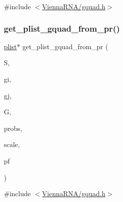 {\ttfamily \#include $<$\mbox{\hyperlink{gquad_8h}{Vienna\+R\+N\+A/gquad.\+h}}$>$}

\mbox{\label{group__gquads_ga098bdc8057dbcef81f9e6390450d4d88}} 
\subsubsection{\texorpdfstring{get\+\_\+plist\+\_\+gquad\+\_\+from\+\_\+pr()}{get\_plist\_gquad\_from\_pr()}}
{\footnotesize\ttfamily \mbox{\hyperlink{group__data__structures_ga9608eed021ebfbdd7a901cfdc446c8e9}{plist}}$\ast$ get\+\_\+plist\+\_\+gquad\+\_\+from\+\_\+pr (\begin{DoxyParamCaption}\item[{short $\ast$}]{S,  }\item[{int}]{gi,  }\item[{int}]{gj,  }\item[{\mbox{\hyperlink{group__data__structures_ga31125aeace516926bf7f251f759b6126}{F\+L\+T\+\_\+\+O\+R\+\_\+\+D\+BL}} $\ast$}]{G,  }\item[{\mbox{\hyperlink{group__data__structures_ga31125aeace516926bf7f251f759b6126}{F\+L\+T\+\_\+\+O\+R\+\_\+\+D\+BL}} $\ast$}]{probs,  }\item[{\mbox{\hyperlink{group__data__structures_ga31125aeace516926bf7f251f759b6126}{F\+L\+T\+\_\+\+O\+R\+\_\+\+D\+BL}} $\ast$}]{scale,  }\item[{\mbox{\hyperlink{group__energy__parameters_ga01d8b92fe734df8d79a6169482c7d8d8}{vrna\+\_\+exp\+\_\+param\+\_\+t}} $\ast$}]{pf }\end{DoxyParamCaption})}



{\ttfamily \#include $<$\mbox{\hyperlink{gquad_8h}{Vienna\+R\+N\+A/gquad.\+h}}$>$}

\mbox{\label{group__gquads_ga226ba34fb481728d243af13b8d17fbd9}} 

